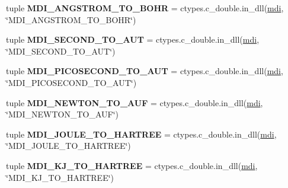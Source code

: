 \begin{DoxyCompactItemize}
\item 
\hypertarget{namespacemolssi__driver__interface_1_1mdi__python_a21d72035f0d2acba9ff7dd65a58e6918}{tuple {\bfseries M\-D\-I\-\_\-\-A\-N\-G\-S\-T\-R\-O\-M\-\_\-\-T\-O\-\_\-\-B\-O\-H\-R} = ctypes.\-c\-\_\-double.\-in\-\_\-dll(\hyperlink{classmdi}{mdi}, \char`\"{}M\-D\-I\-\_\-\-A\-N\-G\-S\-T\-R\-O\-M\-\_\-\-T\-O\-\_\-\-B\-O\-H\-R\char`\"{})}\label{namespacemolssi__driver__interface_1_1mdi__python_a21d72035f0d2acba9ff7dd65a58e6918}

\item 
\hypertarget{namespacemolssi__driver__interface_1_1mdi__python_ae77cfa2b2ce30ceb7d9f531029128f6c}{tuple {\bfseries M\-D\-I\-\_\-\-S\-E\-C\-O\-N\-D\-\_\-\-T\-O\-\_\-\-A\-U\-T} = ctypes.\-c\-\_\-double.\-in\-\_\-dll(\hyperlink{classmdi}{mdi}, \char`\"{}M\-D\-I\-\_\-\-S\-E\-C\-O\-N\-D\-\_\-\-T\-O\-\_\-\-A\-U\-T\char`\"{})}\label{namespacemolssi__driver__interface_1_1mdi__python_ae77cfa2b2ce30ceb7d9f531029128f6c}

\item 
\hypertarget{namespacemolssi__driver__interface_1_1mdi__python_ac646958703528d192805fd3a9e936beb}{tuple {\bfseries M\-D\-I\-\_\-\-P\-I\-C\-O\-S\-E\-C\-O\-N\-D\-\_\-\-T\-O\-\_\-\-A\-U\-T} = ctypes.\-c\-\_\-double.\-in\-\_\-dll(\hyperlink{classmdi}{mdi}, \char`\"{}M\-D\-I\-\_\-\-P\-I\-C\-O\-S\-E\-C\-O\-N\-D\-\_\-\-T\-O\-\_\-\-A\-U\-T\char`\"{})}\label{namespacemolssi__driver__interface_1_1mdi__python_ac646958703528d192805fd3a9e936beb}

\item 
\hypertarget{namespacemolssi__driver__interface_1_1mdi__python_a896e98ac2e70a1b689cecb0d5c032b5f}{tuple {\bfseries M\-D\-I\-\_\-\-N\-E\-W\-T\-O\-N\-\_\-\-T\-O\-\_\-\-A\-U\-F} = ctypes.\-c\-\_\-double.\-in\-\_\-dll(\hyperlink{classmdi}{mdi}, \char`\"{}M\-D\-I\-\_\-\-N\-E\-W\-T\-O\-N\-\_\-\-T\-O\-\_\-\-A\-U\-F\char`\"{})}\label{namespacemolssi__driver__interface_1_1mdi__python_a896e98ac2e70a1b689cecb0d5c032b5f}

\item 
\hypertarget{namespacemolssi__driver__interface_1_1mdi__python_a60e92c8ebacf13a9760a769c6e397aad}{tuple {\bfseries M\-D\-I\-\_\-\-J\-O\-U\-L\-E\-\_\-\-T\-O\-\_\-\-H\-A\-R\-T\-R\-E\-E} = ctypes.\-c\-\_\-double.\-in\-\_\-dll(\hyperlink{classmdi}{mdi}, \char`\"{}M\-D\-I\-\_\-\-J\-O\-U\-L\-E\-\_\-\-T\-O\-\_\-\-H\-A\-R\-T\-R\-E\-E\char`\"{})}\label{namespacemolssi__driver__interface_1_1mdi__python_a60e92c8ebacf13a9760a769c6e397aad}

\item 
\hypertarget{namespacemolssi__driver__interface_1_1mdi__python_a48351f61e209d0b71ee06ae4c356c559}{tuple {\bfseries M\-D\-I\-\_\-\-K\-J\-\_\-\-T\-O\-\_\-\-H\-A\-R\-T\-R\-E\-E} = ctypes.\-c\-\_\-double.\-in\-\_\-dll(\hyperlink{classmdi}{mdi}, \char`\"{}M\-D\-I\-\_\-\-K\-J\-\_\-\-T\-O\-\_\-\-H\-A\-R\-T\-R\-E\-E\char`\"{})}\label{namespacemolssi__driver__interface_1_1mdi__python_a48351f61e209d0b71ee06ae4c356c559}


\end{DoxyCompactItemize}
